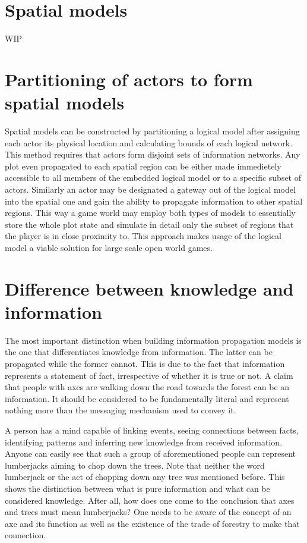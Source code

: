 \section{Spatial models}

WIP

\section{Partitioning of actors to form spatial models}

Spatial models can be constructed by partitioning a logical model after assigning each actor its physical location and calculating bounds of each logical network.
This method requires that actors form disjoint sets of information networks.
Any plot even propagated to each spatial region can be either made immedietely accessible to all members of the embedded logical model or to a specific subset of actors.
Similarly an actor may be designated a gateway out of the logical model into the spatial one and gain the ability to propagate information to other spatial regions.
This way a game world may employ both types of models to essentially store the whole plot state and simulate in detail only the subset of regions that the player is in close proximity to.
This approach makes usage of the logical model a viable solution for large scale open world games.

\section{Difference between knowledge and information}

The most important distinction when building information propagation models is the one that differentiates knowledge from information.
The latter can be propagated while the former cannot.
This is due to the fact that information represents a statement of fact, irrespective of whether it is true or not.
A claim that people with axes are walking down the road towards the forest can be an information.
It should be considered to be fundamentally literal and represent nothing more than the messaging mechanism used to convey it.

A person has a mind capable of linking events, seeing connections between facts, identifying patterns and inferring new knowledge from received information.
Anyone can easily see that such a group of aforementioned people can represent lumberjacks aiming to chop down the trees.
Note that neither the word lumberjack or the act of chopping down any tree was mentioned before.
This shows the distinction between what is pure information and what can be considered knowledge.
After all, how does one come to the conclusion that axes and trees must mean lumberjacks?
One needs to be aware of the concept of an axe and its function as well as the existence of the trade of forestry to make that connection.

